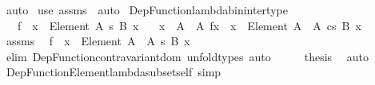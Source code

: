 \begin{isabellebody}
\ auto\isanewline
{}\isamarkupfalse%
\ {\isacharparenleft}{\kern0pt}use\ assms\ \ {\isacartoucheopen}auto{\isacartoucheclose}{\isacharparenright}{\kern0pt}%
\endisatagproof
{\isafoldproof}%
%
\isadelimproof
\isanewline
%
\endisadelimproof
\isanewline
{}\isamarkupfalse%
\ Dep{\isacharunderscore}{\kern0pt}Function{\isacharunderscore}{\kern0pt}lambda{\isacharunderscore}{\kern0pt}bin{\isacharunderscore}{\kern0pt}inter{\isacharunderscore}{\kern0pt}type{\isacharcolon}{\kern0pt}\isanewline
\ \ \ {\isachardoublequoteopen}f\ {\isacharcolon}{\kern0pt}\ {\isacharparenleft}{\kern0pt}x\ {\isacharcolon}{\kern0pt}\ Element\ A{\isacharparenright}{\kern0pt}\ {\isasymrightarrow}s\ B\ x{\isachardoublequoteclose}\isanewline
\ \ \ {\isachardoublequoteopen}{\isacharparenleft}{\kern0pt}{\isasymlambda}x\ {\isasymin}\ A\ {\isasyminter}\ A{\isacharprime}{\kern0pt}{\isachardot}{\kern0pt}\ f{\isacharbackquote}{\kern0pt}x{\isacharparenright}{\kern0pt}\ {\isacharcolon}{\kern0pt}\ {\isacharparenleft}{\kern0pt}x\ {\isacharcolon}{\kern0pt}\ Element\ {\isacharparenleft}{\kern0pt}A\ {\isasyminter}\ A{\isacharprime}{\kern0pt}{\isacharparenright}{\kern0pt}{\isacharparenright}{\kern0pt}\ {\isasymrightarrow}cs\ B\ x{\isachardoublequoteclose}\isanewline
%
\isadelimproof
%
\endisadelimproof
%
\isatagproof
{}\isamarkupfalse%
\ {\isacharminus}{\kern0pt}\isanewline
\ \ \isamarkupfalse%
\ assms\ \isamarkupfalse%
\ {\isachardoublequoteopen}f\ {\isacharcolon}{\kern0pt}\ {\isacharparenleft}{\kern0pt}x\ {\isacharcolon}{\kern0pt}\ Element\ {\isacharparenleft}{\kern0pt}A\ {\isasyminter}\ A{\isacharprime}{\kern0pt}{\isacharparenright}{\kern0pt}{\isacharparenright}{\kern0pt}\ {\isasymrightarrow}s\ B\ x{\isachardoublequoteclose}\isanewline
\ \ \ \ \isamarkupfalse%
\ {\isacharparenleft}{\kern0pt}elim\ Dep{\isacharunderscore}{\kern0pt}Function{\isacharunderscore}{\kern0pt}contravariant{\isacharunderscore}{\kern0pt}dom{\isacharparenright}{\kern0pt}\ {\isacharparenleft}{\kern0pt}unfold{\isacharunderscore}{\kern0pt}types{\isacharcomma}{\kern0pt}\ auto{\isacharparenright}{\kern0pt}\isanewline
\ \ \isamarkupfalse%
\ \isamarkupfalse%
\ {\isacharquery}{\kern0pt}thesis\ \isamarkupfalse%
\ auto\isanewline
{}\isamarkupfalse%
%
\endisatagproof
{\isafoldproof}%
%
\isadelimproof
\isanewline
%
\endisadelimproof
\isanewline
{}\isamarkupfalse%
\ Dep{\isacharunderscore}{\kern0pt}Function{\isacharunderscore}{\kern0pt}Element{\isacharunderscore}{\kern0pt}lambda{\isacharunderscore}{\kern0pt}subset{\isacharunderscore}{\kern0pt}self\ {\isacharbrackleft}{\kern0pt}simp{\isacharbrackright}{\kern0pt}{\isacharcolon}{\kern0pt}\isanewline

\end{isabellebody}
